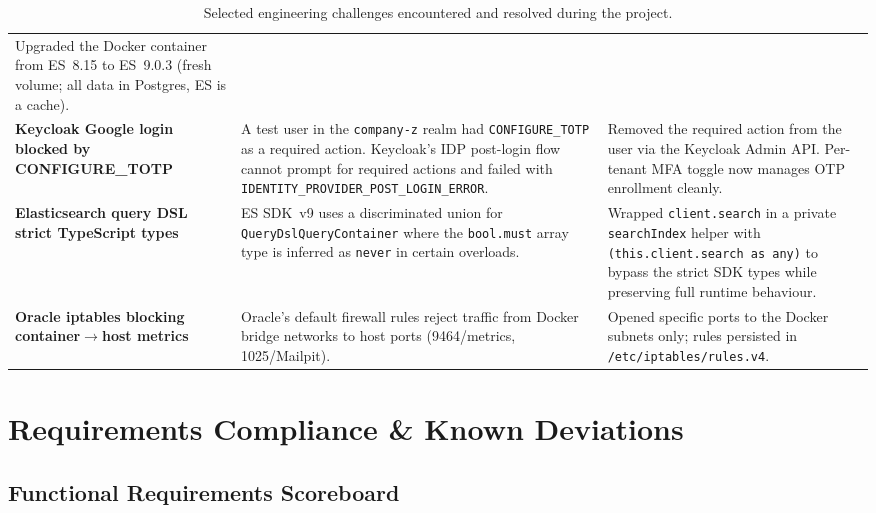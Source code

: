 \documentclass[11pt,a4paper]{article}
\newcommand{\code}[1]{\texttt{\small #1}}
\begin{document}
\begin{table}[H]
\begin{tabularx}{\textwidth}{>{\raggedright\arraybackslash}p{3.1cm} X X}
  Upgraded the Docker container from ES~8.15 to ES~9.0.3 (fresh
  volume; all data in Postgres, ES is a cache). \\
\rowcolor{amdoxlight}
%
\textbf{Keycloak Google login blocked by CONFIGURE\_TOTP} &
  A test user in the \code{company-z} realm had \code{CONFIGURE\_TOTP}
  as a required action. Keycloak's IDP post-login flow cannot prompt
  for required actions and failed with \code{IDENTITY\_PROVIDER\_POST\_LOGIN\_ERROR}. &
  Removed the required action from the user via the Keycloak Admin API.
  Per-tenant MFA toggle now manages OTP enrollment cleanly. \\
%
\textbf{Elasticsearch query DSL strict TypeScript types} &
  ES SDK~v9 uses a discriminated union for \code{QueryDslQueryContainer}
  where the \code{bool.must} array type is inferred as \code{never} in
  certain overloads. &
  Wrapped \code{client.search} in a private \code{searchIndex} helper
  with \code{(this.client.search as any)} to bypass the strict SDK
  types while preserving full runtime behaviour. \\
\rowcolor{amdoxlight}
%
\textbf{Oracle iptables blocking container$\to$host metrics} &
  Oracle's default firewall rules reject traffic from Docker bridge
  networks to host ports (9464/metrics, 1025/Mailpit). &
  Opened specific ports to the Docker subnets only;
  rules persisted in \code{/etc/iptables/rules.v4}. \\
\bottomrule
\end{tabularx}
\caption{Selected engineering challenges encountered and resolved during the project.}
\end{table}

\section{Requirements Compliance \& Known Deviations}\label{sec:compliance}

\subsection{Functional Requirements Scoreboard}
\end{document}
